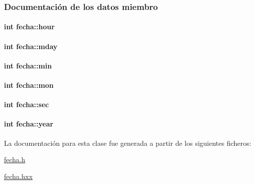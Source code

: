 \subsubsection{Documentación de los datos miembro}
\hypertarget{classfecha_a895a2cc9dd11326a8392a4c6fc928a14}{
\paragraph[{hour}]{\setlength{\rightskip}{0pt plus 5cm}int fecha\-::hour\hspace{0.3cm}{\ttfamily [private]}}}\label{classfecha_a895a2cc9dd11326a8392a4c6fc928a14}
\hypertarget{classfecha_a9c1dc50e5f5efcd3e30a981bfd495b1d}{
\paragraph[{mday}]{\setlength{\rightskip}{0pt plus 5cm}int fecha\-::mday\hspace{0.3cm}{\ttfamily [private]}}}\label{classfecha_a9c1dc50e5f5efcd3e30a981bfd495b1d}
\hypertarget{classfecha_a3875f28ff6e7c383923c80e86afaec2e}{
\paragraph[{min}]{\setlength{\rightskip}{0pt plus 5cm}int fecha\-::min\hspace{0.3cm}{\ttfamily [private]}}}\label{classfecha_a3875f28ff6e7c383923c80e86afaec2e}
\hypertarget{classfecha_a5c86be74f1215600f99798d54126ba16}{
\paragraph[{mon}]{\setlength{\rightskip}{0pt plus 5cm}int fecha\-::mon\hspace{0.3cm}{\ttfamily [private]}}}\label{classfecha_a5c86be74f1215600f99798d54126ba16}
\hypertarget{classfecha_a09eb9f4865c9ff896f438b8df3cf6485}{
\paragraph[{sec}]{\setlength{\rightskip}{0pt plus 5cm}int fecha\-::sec\hspace{0.3cm}{\ttfamily [private]}}}\label{classfecha_a09eb9f4865c9ff896f438b8df3cf6485}
\hypertarget{classfecha_a4d06534f05a6350ae229ce2b17b860e8}{
\paragraph[{year}]{\setlength{\rightskip}{0pt plus 5cm}int fecha\-::year\hspace{0.3cm}{\ttfamily [private]}}}\label{classfecha_a4d06534f05a6350ae229ce2b17b860e8}


La documentación para esta clase fue generada a partir de los siguientes ficheros\-:\begin{DoxyCompactItemize}
\item 
\hyperlink{fecha_8h}{fecha.\-h}\item 
\hyperlink{fecha_8hxx}{fecha.\-hxx}\end{DoxyCompactItemize}
